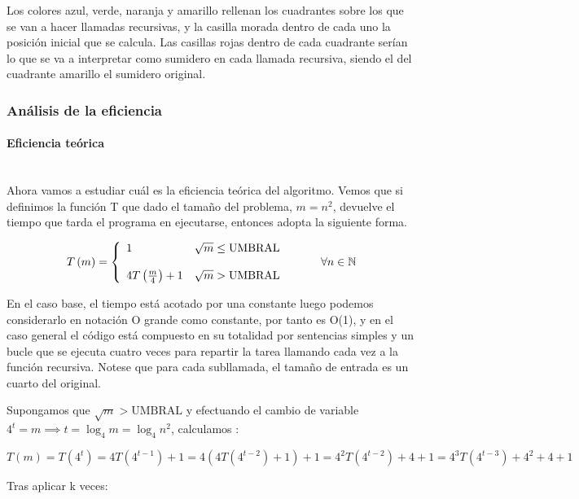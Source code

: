 \documentclass{article}
\newcommand{\myparagraph}[1]{\paragraph{#1}\mbox{}\\}
\newcommand\N{\ensuremath{\mathbb N}\space}
\begin{document}
    Los colores azul, verde, naranja y amarillo rellenan los cuadrantes
    sobre los que se van a hacer llamadas recursivas, y la casilla morada
    dentro de cada uno la posición inicial que se calcula. Las casillas
    rojas dentro de cada cuadrante serían lo que se va a interpretar como
    sumidero en cada llamada recursiva, siendo el del cuadrante amarillo
    el sumidero original.

\subsubsection{Análisis de la eficiencia} %
\myparagraph{Eficiencia teórica} %

    Ahora vamos a estudiar cuál es la eficiencia teórica del algoritmo. Vemos que si definimos la función T que dado el tamaño del problema, $ m = n^{2}$, 
    devuelve el tiempo que tarda el programa en ejecutarse, entonces adopta la siguiente forma. 
    
    \begin{equation} \label{eq:ef_dyv_p1}
    T\left(m\right) = \left\{ \begin{array}{lcc} 1 & \sqrt{m}\leq \text{UMBRAL}  \\ \\ 
    4T\left(\frac{m}{4}\right) + 1 &  \sqrt{m} > \text{UMBRAL}  \\ \end{array} \right. \hspace{10mm} \forall n \in \N
    \end{equation}

    En el caso base, el tiempo está acotado por una constante luego podemos considerarlo en notación O grande como constante, por tanto es O(1), y en el caso general el código está compuesto en su totalidad por sentencias simples y un bucle que se ejecuta cuatro veces para repartir la tarea llamando cada vez a la función recursiva. Notese que para cada subllamada, el tamaño de entrada 
    es un cuarto del original.
    
    Supongamos que $\sqrt{m} > \text{UMBRAL}$  y efectuando el cambio de variable 
    $ 4^{t} = m \implies t = \log_{4}{m} = \log_{4}{n^2} $, calculamos : 

    \[ 
      T\left(m\right) = T\left(4^{t}\right) = 4 T\left(4^{t-1}\right) + 1 = 4 (4 T\left(4^{t-2}\right) + 1) + 1 = 4^{2} T\left(4^{t-2}\right) + 4 + 1 = 4^{3} T\left(4^{t-3}\right) + 4^{2} + 4 + 1 
    \]

    Tras aplicar k veces: 
    
\end{document}
